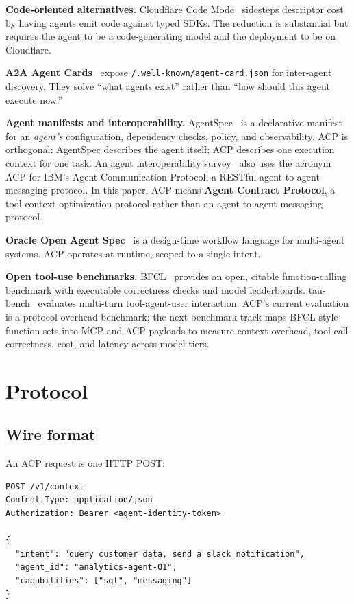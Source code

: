 \documentclass[11pt,a4paper]{article}
\begin{document}
\textbf{Code-oriented alternatives.} Cloudflare Code Mode~\cite{cfcodemode}
sidesteps descriptor cost by having agents emit code against typed SDKs. The
reduction is substantial but requires the agent to be a code-generating model
and the deployment to be on Cloudflare.

\textbf{A2A Agent Cards}~\cite{a2a} expose
\texttt{/.well-known/agent-card.json} for inter-agent discovery. They solve
``what agents exist'' rather than ``how should this agent execute now.''

\textbf{Agent manifests and interoperability.} AgentSpec~\cite{agentspec} is
a declarative manifest for an \emph{agent's} configuration, dependency checks,
policy, and observability. ACP is orthogonal: AgentSpec describes the agent
itself; ACP describes one execution context for one task. An agent
interoperability survey~\cite{ehtesham2025interop} also uses the acronym ACP
for IBM's Agent Communication Protocol, a RESTful agent-to-agent messaging
protocol. In this paper, ACP means \textbf{Agent Contract Protocol}, a
tool-context optimization protocol rather than an agent-to-agent messaging
protocol.

\textbf{Oracle Open Agent Spec}~\cite{oracleopenagent} is a design-time
workflow language for multi-agent systems. ACP operates at runtime, scoped
to a single intent.

\textbf{Open tool-use benchmarks.} BFCL~\cite{patil2025bfcl} provides an
open, citable function-calling benchmark with executable correctness checks
and model leaderboards. tau-bench~\cite{yao2024taubench} evaluates multi-turn
tool-agent-user interaction. ACP's current evaluation is a protocol-overhead
benchmark; the next benchmark track maps BFCL-style function sets into MCP and
ACP payloads to measure context overhead, tool-call correctness, cost, and
latency across model tiers.

\section{Protocol}

\subsection{Wire format}

An ACP request is one HTTP POST:

\begin{lstlisting}
POST /v1/context
Content-Type: application/json
Authorization: Bearer <agent-identity-token>

{
  "intent": "query customer data, send a slack notification",
  "agent_id": "analytics-agent-01",
  "capabilities": ["sql", "messaging"]
}
\end{lstlisting}
\end{document}
